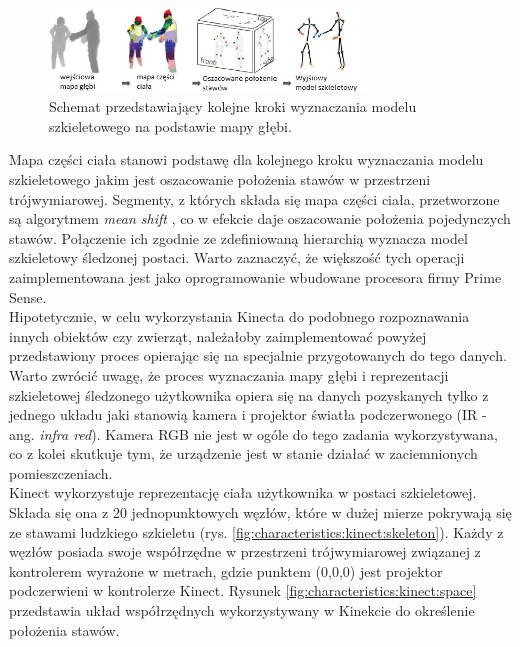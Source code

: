 \begin{figure}[!htp]
	\centering	
	\includegraphics[width=0.75\textwidth]{images/KinectRecognitionSteps.jpg}
	\caption{Schemat przedstawiający kolejne kroki wyznaczania modelu szkieletowego na podstawie mapy głębi.}
	\label{fig:literature:kinect:classificationSteps}
\end{figure}
		
Mapa części ciała stanowi podstawę dla kolejnego kroku wyznaczania modelu szkieletowego jakim jest oszacowanie położenia stawów w przestrzeni trójwymiarowej. Segmenty, z których składa się mapa części ciała, przetworzone są algorytmem \emph{mean shift} \cite{Comaniciu2003}, co w efekcie daje oszacowanie położenia pojedynczych stawów. Połączenie ich zgodnie ze zdefiniowaną hierarchią wyznacza model szkieletowy śledzonej postaci. Warto zaznaczyć, że większość tych operacji zaimplementowana jest jako oprogramowanie wbudowane procesora firmy Prime Sense.\\
		
Hipotetycznie, w celu wykorzystania Kinecta do podobnego rozpoznawania innych obiektów czy zwierząt, należałoby zaimplementować powyżej przedstawiony proces opierając się na specjalnie przygotowanych do tego danych.
Warto zwrócić uwagę, że proces wyznaczania mapy głębi i reprezentacji szkieletowej śledzonego użytkownika opiera się na danych pozyskanych tylko z jednego układu jaki stanowią kamera i projektor światła podczerwonego (IR - ang. \textit{infra red}). Kamera RGB nie jest w ogóle do tego zadania wykorzystywana, co z kolei skutkuje tym, że urządzenie jest w stanie działać w zaciemnionych pomieszczeniach.\\
		
Kinect wykorzystuje reprezentację ciała użytkownika w postaci szkieletowej. Składa się ona z 20 jednopunktowych węzłów, które w dużej mierze pokrywają się ze stawami ludzkiego szkieletu (rys. \ref{fig:characteristics:kinect:skeleton}). Każdy z węzłów posiada swoje współrzędne w przestrzeni trójwymiarowej związanej z kontrolerem wyrażone w metrach, gdzie punktem (0,0,0) jest projektor podczerwieni w kontrolerze Kinect. Rysunek \ref{fig:characteristics:kinect:space} przedstawia układ współrzędnych wykorzystywany w Kinekcie do określenie położenia stawów. 
		
